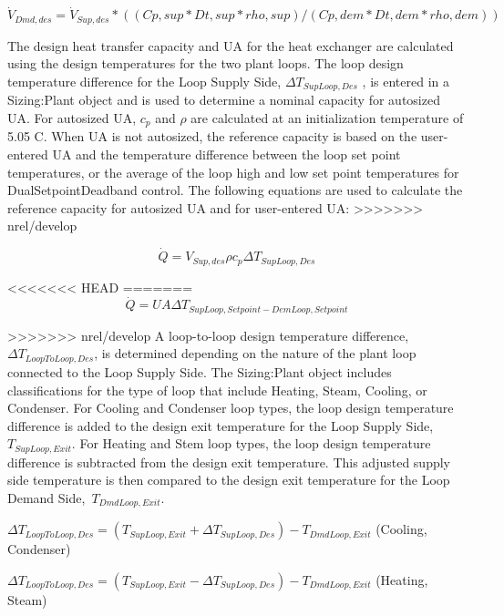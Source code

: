 \begin{equation}
{\dot V_{Dmd,des}} = {\dot V_{Sup,des} * {((Cp,sup * Dt,sup * rho,sup) / (Cp,dem * Dt,dem * rho,dem))}}
\end{equation}

The design heat transfer capacity and UA for the heat exchanger are calculated using the design temperatures for the two plant loops. The loop design temperature difference for the Loop Supply Side, \(\Delta {T_{SupLoop,Des}}\) , is entered in a Sizing:Plant object and is used to determine a nominal capacity for autosized UA. For autosized UA, \(c_p\) and \(\rho\) are calculated at an initialization temperature of 5.05 C. When UA is not autosized, the reference capacity is based on the user-entered UA and the temperature difference between the loop set point temperatures, or the average of the loop high and low set point temperatures for DualSetpointDeadband control. The following equations are used to calculate the reference capacity for autosized UA and for user-entered UA:
>>>>>>> nrel/develop

\begin{equation}
\dot Q = V_{Sup,des} \rho {c_p} \Delta {T_{SupLoop,Des}}
\end{equation}

<<<<<<< HEAD
=======
\begin{equation}
\dot Q = UA \Delta {T_{SupLoop,Setpoint - DemLoop,Setpoint}}
\end{equation}

>>>>>>> nrel/develop
A loop-to-loop design temperature difference, \(\Delta {T_{LoopToLoop,Des}}\), is determined depending on the nature of the plant loop connected to the Loop Supply Side. The Sizing:Plant object includes classifications for the type of loop that include Heating, Steam, Cooling, or Condenser. For Cooling and Condenser loop types, the loop design temperature difference is added to the design exit temperature for the Loop Supply Side, \({T_{SupLoop,Exit}}\). For Heating and Stem loop types, the loop design temperature difference is subtracted from the design exit temperature. This adjusted supply side temperature is then compared to the design exit temperature for the Loop Demand Side,~\({T_{DmdLoop,Exit}}\).

\(\Delta {T_{LoopToLoop,Des}} = \left( {{T_{SupLoop,Exit}} + \Delta {T_{SupLoop,Des}}} \right) - {T_{DmdLoop,Exit}}\) (Cooling, Condenser)

\(\Delta {T_{LoopToLoop,Des}} = \left( {{T_{SupLoop,Exit}} - \Delta {T_{SupLoop,Des}}} \right) - {T_{DmdLoop,Exit}}\) (Heating, Steam)

